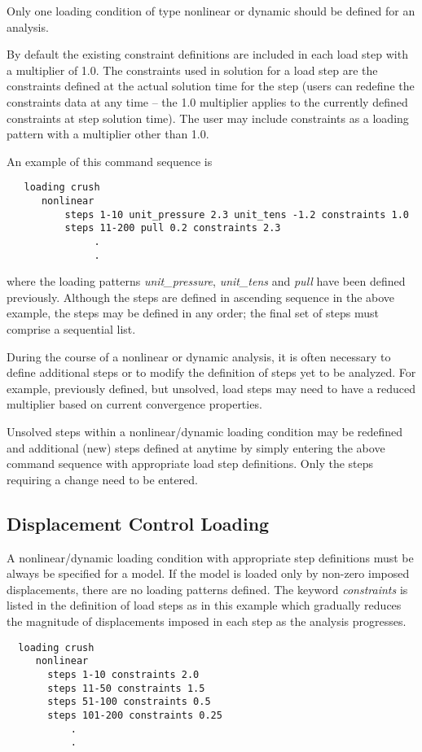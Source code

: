 \documentclass[11pt]{report}
\numberwithin{equation}{section}
\newcommand{\noi}{\noindent}
\newcommand{\ti}{\emph}
\begin{document}
Only one loading condition of type nonlinear or dynamic should be 
defined for an analysis.

By default the existing constraint definitions are included in each load step 
with a multiplier of 1.0. The constraints used in solution for a load step 
are the constraints defined at the actual solution time for the step 
(users can redefine the constraints data at any time -- 
the 1.0 multiplier applies to the currently defined constraints at step solution time). The
user may include constraints as a loading pattern with a multiplier other than 1.0.

An example of this command sequence is
\small
\begin{verbatim}
   loading crush
      nonlinear
          steps 1-10 unit_pressure 2.3 unit_tens -1.2 constraints 1.0
          steps 11-200 pull 0.2 constraints 2.3
               . 
               .
 \end{verbatim}
\normalsize
\noi where the loading patterns \ti{unit\_pressure}, 
\ti{unit\_tens} and \ti{pull} have been defined previously.
Although the steps are defined in ascending sequence in the above example, the steps may
be defined in any order; the final set of steps must comprise a sequential list.

\noi {\bf{\ti{Modifying Step Definitions}}}

\noi During the course of a nonlinear or dynamic analysis, it is often necessary to define 
additional steps or to modify the definition of steps yet to be analyzed. For example, previously
defined, but unsolved, load steps may need to have a reduced multiplier based on current
convergence properties.

Unsolved steps within a nonlinear/dynamic loading condition may be redefined and
additional (new) steps defined at anytime by simply entering the above command sequence
with appropriate load step definitions. Only the steps requiring a change need to be entered.

\subsection{Displacement Control Loading}
\noi  A nonlinear/dynamic loading condition with appropriate step definitions must be always
be specified for a model. If the model is loaded only by non-zero imposed
displacements, there are no loading patterns defined. The keyword \ti{constraints} is
listed in the definition of load steps as in this example which gradually reduces the
magnitude of displacements imposed in each step as the analysis progresses.
\small
\begin{verbatim}
  loading crush
     nonlinear
       steps 1-10 constraints 2.0
       steps 11-50 constraints 1.5
       steps 51-100 constraints 0.5
       steps 101-200 constraints 0.25
           .
           .
 \end{verbatim}
\normalsize
\end{document}
